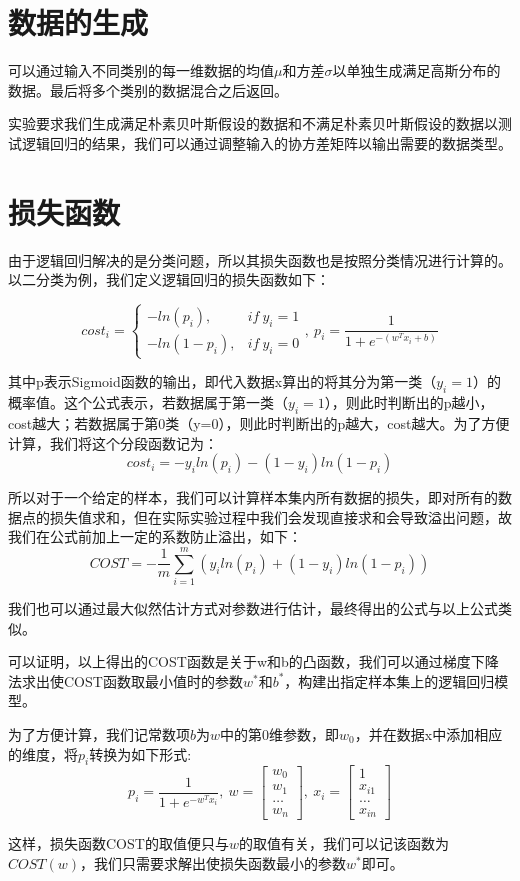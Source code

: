 \documentclass[12pt]{article}
\begin{document}
\section{数据的生成}
可以通过输入不同类别的每一维数据的均值$\mu$和方差$\sigma$以单独生成满足高斯分布的数据。最后将多个类别的数据混合之后返回。\par
实验要求我们生成满足朴素贝叶斯假设的数据和不满足朴素贝叶斯假设的数据以测试逻辑回归的结果，我们可以通过调整输入的协方差矩阵以输出需要的数据类型。\par
\section{损失函数}
由于逻辑回归解决的是分类问题，所以其损失函数也是按照分类情况进行计算的。以二分类为例，我们定义逻辑回归的损失函数如下：\par
\[cost_i=\begin{cases}
    -ln(p_i),&if\ y_i=1\\
    -ln(1-p_i),&if\ y_i=0
\end{cases},\ p_i=\frac{1}{1+e^{-(w^Tx_i+b)}}\]\par
其中p表示Sigmoid函数的输出，即代入数据x算出的将其分为第一类（$y_i=1$）的概率值。这个公式表示，若数据属于第一类（$y_i=1$），则此时判断出的p越小，cost越大；若数据属于第0类（y=0），则此时判断出的p越大，cost越大。为了方便计算，我们将这个分段函数记为：
\[cost_i=-y_iln(p_i)-(1-y_i)ln(1-p_i)\]\par
所以对于一个给定的样本，我们可以计算样本集内所有数据的损失，即对所有的数据点的损失值求和，但在实际实验过程中我们会发现直接求和会导致溢出问题，故我们在公式前加上一定的系数防止溢出，如下：
\[COST=-\frac{1}{m}\sum_{i=1}^m(y_iln(p_i)+(1-y_i)ln(1-p_i))\]\par
我们也可以通过最大似然估计方式对参数进行估计，最终得出的公式与以上公式类似。\par
可以证明，以上得出的COST函数是关于w和b的凸函数，我们可以通过梯度下降法求出使COST函数取最小值时的参数$w^*$和$b^*$，构建出指定样本集上的逻辑回归模型。\par
为了方便计算，我们记常数项$b$为$w$中的第0维参数，即$w_0$，并在数据x中添加相应的维度，将$p_i$转换为如下形式:
\[p_i=\frac{1}{1+e^{-w^Tx_i}},\ 
w=\begin{bmatrix}
    w_0\\w_1\\\dots\\w_n
\end{bmatrix},\ 
x_i=\begin{bmatrix}
    1\\x_{i1}\\\dots\\x_{in}
\end{bmatrix}\]\par
这样，损失函数COST的取值便只与$w$的取值有关，我们可以记该函数为$COST(w)$，我们只需要求解出使损失函数最小的参数$w^*$即可。
\end{document}
